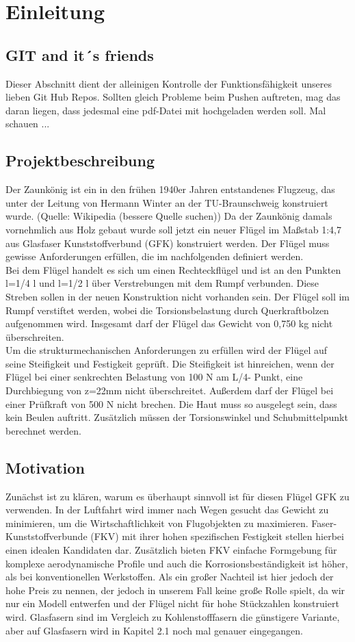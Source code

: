\documentclass[a4paper,12p]{article}
\begin{document}
\tableofcontents
\section{Einleitung}

\subsection{GIT and it´s friends}
Dieser Abschnitt dient der alleinigen Kontrolle der Funktionsfähigkeit unseres lieben Git Hub Repos. Sollten gleich Probleme beim Pushen auftreten, mag das daran liegen, dass jedesmal eine pdf-Datei mit hochgeladen werden soll. Mal schauen ...

\subsection{Projektbeschreibung}
Der Zaunkönig ist ein in den frühen 1940er Jahren entstandenes Flugzeug, das unter der Leitung von Hermann Winter an der TU-Braunschweig konstruiert wurde. (Quelle: Wikipedia (bessere Quelle suchen)) Da der Zaunkönig damals vornehmlich aus Holz gebaut wurde soll jetzt ein neuer Flügel im Maßstab 1:4,7 aus Glasfaser Kunststoffverbund (GFK) konstruiert werden. Der Flügel muss gewisse Anforderungen erfüllen, die im nachfolgenden definiert werden.\\
Bei dem Flügel handelt es sich um einen Rechteckflügel und ist an den Punkten l=1/4 l und l=1/2 l über Verstrebungen mit dem Rumpf verbunden. Diese Streben sollen in der neuen Konstruktion nicht vorhanden sein. Der Flügel soll im Rumpf verstiftet werden, wobei die Torsionsbelastung durch Querkraftbolzen aufgenommen wird. Insgesamt darf der Flügel das Gewicht von 0,750 kg nicht überschreiten.\\
Um die strukturmechanischen Anforderungen zu erfüllen wird der Flügel auf seine Steifigkeit und Festigkeit geprüft. Die Steifigkeit ist hinreichen, wenn der Flügel bei einer senkrechten Belastung von 100 N am L/4- Punkt, eine Durchbiegung von z=22mm nicht überschreitet. Außerdem darf der Flügel bei einer Prüfkraft von 500 N nicht brechen. Die Haut muss so ausgelegt sein, dass kein Beulen auftritt. Zusätzlich müssen der Torsionswinkel und Schubmittelpunkt berechnet werden.

\subsection{Motivation}
Zunächst ist zu klären, warum es überhaupt sinnvoll ist für diesen Flügel GFK zu verwenden. In der Luftfahrt wird immer nach Wegen gesucht das Gewicht zu minimieren, um die Wirtschaftlichkeit von Flugobjekten zu maximieren. Faser-Kunststoffverbunde (FKV) mit ihrer hohen spezifischen Festigkeit stellen hierbei einen idealen Kandidaten dar. Zusätzlich bieten FKV einfache Formgebung für komplexe aerodynamische Profile und auch die Korrosionsbeständigkeit ist höher, als bei konventionellen Werkstoffen. Als ein großer Nachteil ist hier jedoch der hohe Preis zu nennen, der jedoch in unserem Fall keine große Rolle spielt, da wir nur ein Modell entwerfen und der Flügel nicht für hohe Stückzahlen konstruiert wird. Glasfasern sind im Vergleich zu Kohlenstofffasern die günstigere Variante, aber auf Glasfasern wird in Kapitel 2.1 noch mal genauer eingegangen.
\end{document}
